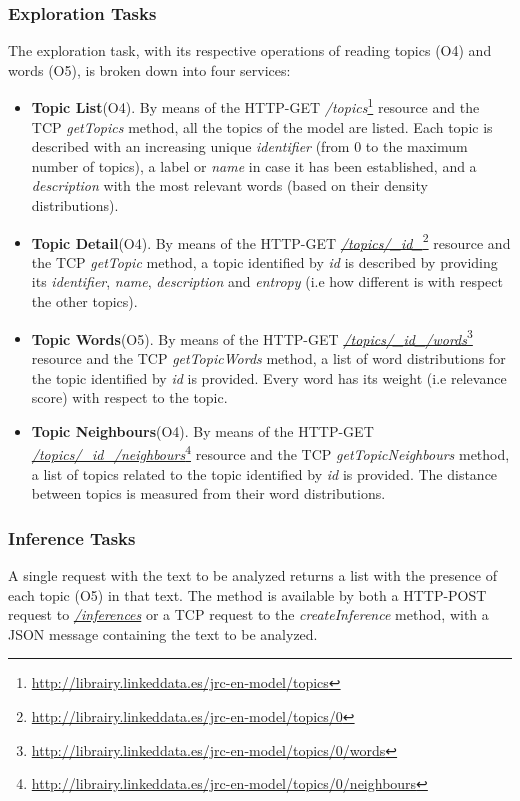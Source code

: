 \subsubsection{Exploration Tasks}
The exploration task, with its respective operations of reading topics (O4) and words (O5), is broken down into four services:

\begin{itemize}
\item \textbf{Topic List}(O4). By means of the HTTP-GET \textit{/topics}\footnote{\url{http://librairy.linkeddata.es/jrc-en-model/topics}} resource and the TCP \textit{getTopics} method, all the topics of the model are listed. Each topic is described with an increasing unique \textit{identifier} (from 0 to the maximum number of topics), a label or \textit{name} in case it has been established, and a \textit{description} with the most relevant words (based on their density distributions). 
\item \textbf{Topic Detail}(O4). By means of the HTTP-GET \textit{\url{/topics/_id_}}\footnote{\url{http://librairy.linkeddata.es/jrc-en-model/topics/0}} resource and the TCP \textit{getTopic} method, a topic identified by \textit{id} is described by providing its \textit{identifier}, \textit{name}, \textit{description} and \textit{entropy} (i.e how different is with respect the other topics).
\item \textbf{Topic Words}(O5). By means of the HTTP-GET \textit{\url{/topics/_id_/words}}\footnote{\url{http://librairy.linkeddata.es/jrc-en-model/topics/0/words}} resource and the TCP \textit{getTopicWords} method, a list of word distributions for the topic identified by \textit{id} is provided. Every word has its weight (i.e relevance score) with respect to the topic.
\item \textbf{Topic Neighbours}(O4). By means of the HTTP-GET \textit{\url{/topics/_id_/neighbours}}\footnote{\url{http://librairy.linkeddata.es/jrc-en-model/topics/0/neighbours}} resource and the TCP \textit{getTopicNeighbours} method, a list of topics related to the topic identified by \textit{id} is provided. The distance between topics is measured from their word distributions.  
\end{itemize}

\subsubsection{Inference Tasks}

A single request with the text to be analyzed returns a list with the presence of each topic (O5) in that text. The method is available by both a HTTP-POST request to \textit{\url{/inferences}} or a TCP request to the  \textit{createInference} method, with a JSON message containing the text  to be analyzed.


